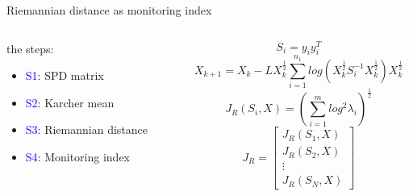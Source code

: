 \documentclass[10pt]{beamer}
\begin{document}
\begin{frame}{Riemannian distance as monitoring index}
   \begin{columns}
        \begin{column}{0.5\textwidth}
            the steps:
      \begin{itemize}
      \item \textcolor{blue}{S1}:   SPD matrix
      \item \textcolor{blue}{S2}:  Karcher mean
      \item \textcolor{blue}{S3}:  Riemannian distance
      \item  \textcolor{blue}{S4}:  Monitoring index
 	 \end{itemize}  
        \end{column}
        \begin{column}{0.6\textwidth}  %
               \begin{equation}
              S_i = y_iy_i^T
               \end{equation}
               \begin{equation}
                 X_{k+1}=X_k-L X_k^{\frac{1}{2}}\sum\limits^{n_1}_{i=1}log(X_k^{\frac{1}{2}}S_i^{-1}X_k^{\frac{1}{2}})X_k^{\frac{1}{2}}
               \end{equation}
                \begin{equation}
                  J_R(S_i,X) =  \left(  \sum_{i=1}^mlog^2\lambda_i  \right)^\frac{1}{2}
                \end{equation}
                 \begin{equation}
                  J_R =  \begin{bmatrix}
                          J_R(S_1,X) \\
                          J_R(S_2,X) \\
                          \vdots     \\
                           J_R(S_N,X)
                         \end{bmatrix}
                         \label{Jr}
                \end{equation}
        \end{column}
    \end{columns}
\end{frame}
\end{document}
